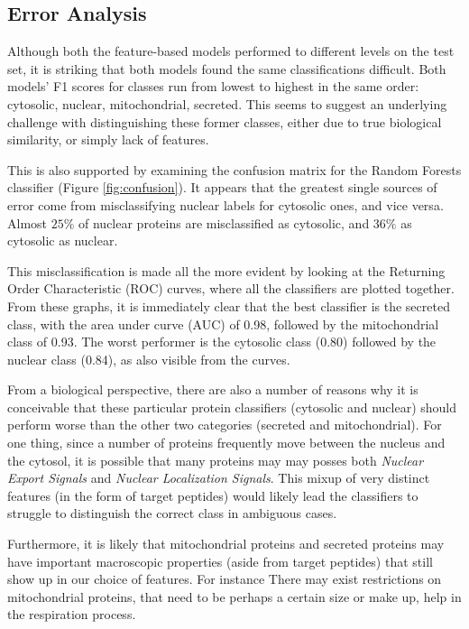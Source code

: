 \documentclass{bioinfo}
\begin{document}
\subsection{Error Analysis}

Although both the feature-based models performed to different levels on the test set, it is striking that both models found the same classifications difficult. 
Both models' F1 scores for classes run from lowest to highest in the same order: cytosolic, nuclear, mitochondrial, secreted.
This seems to suggest an underlying challenge with distinguishing these former classes, either due to true biological similarity, or simply lack of features.

This is also supported by examining the confusion matrix for the Random Forests classifier (Figure \ref{fig:confusion}).
It appears that the greatest single sources of error come from misclassifying nuclear labels for cytosolic ones, and vice versa. Almost $25\%$ of nuclear proteins are misclassified as cytosolic, and $36\%$ as cytosolic as nuclear.

This misclassification is made all the more evident by looking at the Returning Order Characteristic (ROC) curves, where all the classifiers are plotted together. 
From these graphs, it is immediately clear that the best classifier is the secreted class, with the area under curve (AUC) of 0.98, followed by the mitochondrial class of 0.93. The worst performer is the cytosolic class (0.80) followed by the nuclear class (0.84), as also visible from the curves.

From a biological perspective, there are also a number of reasons why it is conceivable that these particular protein classifiers (cytosolic and nuclear) should perform worse than the other two categories (secreted and mitochondrial). 
For one thing, since a number of proteins frequently move between the nucleus and the cytosol, it is possible that many proteins may may posses both \textit{Nuclear Export Signals} and \textit{Nuclear Localization Signals}. 
This mixup of very distinct features (in the form of target peptides) would likely lead the classifiers to struggle to distinguish the correct class in ambiguous cases.

Furthermore, it is likely that mitochondrial proteins and secreted proteins may have important macroscopic properties (aside from target peptides) that still show up in our choice of features.
For instance There may exist restrictions on mitochondrial proteins, that need to be perhaps a certain size or make up, help in the respiration process.
\end{document}
